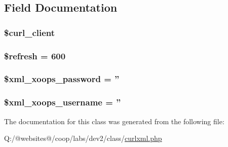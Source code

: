 \subsection{Field Documentation}
\hypertarget{class_c_u_r_l_x_m_l_xortify_exchange_a402f2112991f3227835af80e9df33e38}{
\subsubsection[{\$curl\-\_\-client}]{\setlength{\rightskip}{0pt plus 5cm}\$curl\-\_\-client}}\label{class_c_u_r_l_x_m_l_xortify_exchange_a402f2112991f3227835af80e9df33e38}
\hypertarget{class_c_u_r_l_x_m_l_xortify_exchange_a8527f826b6959aaa92b0e51ee427ba1a}{
\subsubsection[{\$refresh}]{\setlength{\rightskip}{0pt plus 5cm}\$refresh = 600}}\label{class_c_u_r_l_x_m_l_xortify_exchange_a8527f826b6959aaa92b0e51ee427ba1a}
\hypertarget{class_c_u_r_l_x_m_l_xortify_exchange_a8ec2889165c837354fded1cedbd42157}{
\subsubsection[{\$xml\-\_\-xoops\-\_\-password}]{\setlength{\rightskip}{0pt plus 5cm}\$xml\-\_\-xoops\-\_\-password = ''}}\label{class_c_u_r_l_x_m_l_xortify_exchange_a8ec2889165c837354fded1cedbd42157}
\hypertarget{class_c_u_r_l_x_m_l_xortify_exchange_a725df0dd6b578e15522ed15945e5901c}{
\subsubsection[{\$xml\-\_\-xoops\-\_\-username}]{\setlength{\rightskip}{0pt plus 5cm}\$xml\-\_\-xoops\-\_\-username = ''}}\label{class_c_u_r_l_x_m_l_xortify_exchange_a725df0dd6b578e15522ed15945e5901c}


The documentation for this class was generated from the following file\-:\begin{DoxyCompactItemize}
\item 
Q\-:/@websites@/coop/labs/dev2/class/\hyperlink{curlxml_8php}{curlxml.\-php}\end{DoxyCompactItemize}
